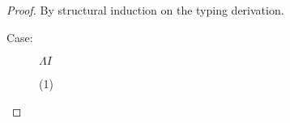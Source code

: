 
\WHNFConvSoundness

\begin{proof}
By structural induction on the typing derivation.

\begin{description}

\item[Case:] $\Lambda I$
\begin{tabbing}
    (1)
\end{tabbing}

\end{description}
\end{proof}

